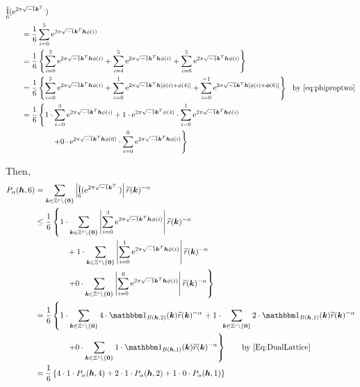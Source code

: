 \documentclass{amsart}
\newcommand{\tr}{\widetilde{r}}
\DeclareMathOperator{\appxint}{\hat{I}}
\begin{document}
\begin{align*}
   \MoveEqLeft{\appxint_{6}(\me^{2 \pi \sqrt{-1} \vk^T \cdot})}\\
    &= \frac 1{6} \sum_{i=0}^{5} \me^{2 \pi \sqrt{-1} \vk^T \vh\phi(i)} \\
    &= \frac {1}{6} \left\{ \sum_{i=0}^3 \me^{2 \pi \sqrt{-1} \vk^T \vh\phi(i)} + \sum_{i=4}^5 \me^{2 \pi \sqrt{-1} \vk^T \vh\phi(i)} + \sum_{i=6}^5 \me^{2 \pi \sqrt{-1} \vk^T \vh\phi(i)}  \right\} \\
    &= \frac {1}{6} \left\{ \sum_{i=0}^3 \me^{2 \pi \sqrt{-1} \vk^T \vh\phi(i)} + \sum_{i=0}^1 \me^{2 \pi \sqrt{-1} \vk^T \vh[\phi(i)+\phi(4)]} + \sum_{i=0}^{-1} \me^{2 \pi \sqrt{-1} \vk^T \vh[\phi(i)+\vphi(6)]}  \right\} \ \ \text{by \eqref{eq:phiproptwo}} \\
    &= \frac {1}{6} \left\{ 1\cdot\sum_{i=0}^{3}\me^{2 \pi \sqrt{-1} \vk^T \vh\phi(i)} + 1 \cdot \me^{2 \pi \sqrt{-1} \vk^T \phi(4)} \cdot \sum_{i=0}^{1}\me^{2 \pi \sqrt{-1} \vk^T \vh\phi(i)} \right . \\
    & \qquad \qquad \left . +  0 \cdot
    \me^{2 \pi \sqrt{-1} \vk^T \vh\phi(6)} \cdot \sum_{i=0}^{0}\me^{2 \pi \sqrt{-1} \vk^T \vh\phi(i)} \right\}
\end{align*}

 Then,
\begin{align*}
    P_\alpha(\vh,6) & = \sum_{\vk \in \integers^s \setminus\{\vzero\}}
    \abs{\appxint_6(\me^{2 \pi \sqrt{-1} \vk^T \cdot})}\tr(\vk)^{-\alpha}
    \\
    & \le
    \frac {1}{6} \left\{ 1\cdot\sum_{\vk \in \integers^s \setminus\{\vzero\}} \abs{\sum_{i=0}^{3}\me^{2 \pi \sqrt{-1} \vk^T \vh\phi(i)}} \tr(\vk)^{-\alpha}  \right .
    \\
    & \qquad \qquad + 1  \cdot \sum_{\vk \in \integers^s \setminus\{\vzero\}} \abs{\sum_{i=0}^{1}\me^{2 \pi \sqrt{-1} \vk^T \vh\phi(i)}} \tr(\vk)^{-\alpha}  \\
    & \qquad \qquad \left . +  0
    \cdot \sum_{\vk \in \integers^s \setminus\{\vzero\}} \abs{\sum_{i=0}^{0}\me^{2 \pi \sqrt{-1} \vk^T \vh\phi(i)}}  \tr(\vk)^{-\alpha} \right\}\\
    & =
    \frac {1}{6} \left\{ 1\cdot\sum_{\vk \in \integers^s \setminus\{\vzero\}} 4 \cdot \bbone_{B(\vh,2)}(\vk) \tr(\vk)^{-\alpha}  \right .
    + 1  \cdot \sum_{\vk \in \integers^s \setminus\{\vzero\}}2 \cdot \bbone_{B(\vh,1)}(\vk) \tr(\vk)^{-\alpha}  \\
    & \qquad \qquad \left . +  0
    \cdot \sum_{\vk \in \integers^s \setminus\{\vzero\}} 1 \cdot \bbone_{B(\vh,1)}(\vk)  \tr(\vk)^{-\alpha} \right\} \qquad \text{by \eqref{Eq:DualLattice}}\\
    & = \frac {1}{6} \left\{ 4 \cdot 1 \cdot P_\alpha(\vh,4)+ 2 \cdot 1 \cdot P_\alpha(\vh,2)+ 1 \cdot 0 \cdot P_\alpha(\vh,1) \right\} \\
\end{align*}
\end{document}
